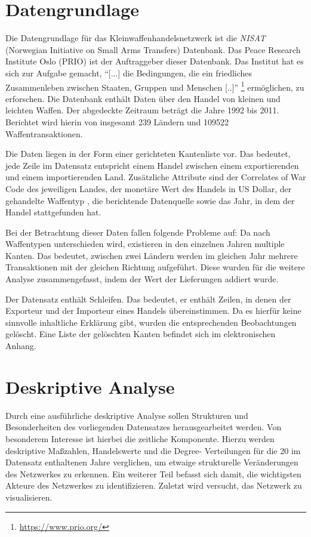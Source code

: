 \documentclass[a4paper,ngerman,oneside,titlepage,bibliography=totoc,11pt]{scrreprt}
\begin{document}
\chapter{Datengrundlage}
Die Datengrundlage für das Kleinwaffenhandelsnetzwerk ist die \emph{NISAT} (Norwegian Initiative on Small Arms Transfers) Datenbank. Das Peace Research Institute Oslo (PRIO) ist der Auftraggeber dieser Datenbank. Das Institut hat es sich zur Aufgabe gemacht, "`[...] die Bedingungen, die ein friedliches Zusammenleben zwischen Staaten, Gruppen und Menschen [..]"' \footnote{\url{https://www.prio.org/}} ermöglichen, zu erforschen. Die Datenbank enthält Daten über den Handel von kleinen und leichten Waffen. Der abgedeckte Zeitraum beträgt die Jahre 1992 bis 2011. Berichtet wird hierin von insgesamt 239 Ländern und 109522 Waffentransaktionen.

Die Daten liegen in der Form einer gerichteten Kantenliste vor. Das bedeutet, jede Zeile im Datensatz entspricht einem Handel zwischen einem exportierenden und einem importierenden Land. Zusätzliche Attribute sind der Correlates of War Code des jeweiligen Landes, der monetäre Wert des Handels in US Dollar, der gehandelte Waffentyp , die berichtende Datenquelle sowie das Jahr, in dem der Handel stattgefunden hat.

Bei der Betrachtung dieser Daten fallen folgende Probleme auf:
Da nach Waffentypen unterschieden wird, existieren in den einzelnen Jahren multiple Kanten. Das bedeutet, zwischen zwei Ländern werden im gleichen Jahr mehrere Transaktionen mit der gleichen Richtung aufgeführt. Diese wurden für die weitere Analyse zusammengefasst, indem der Wert der Lieferungen addiert wurde.

Der Datensatz enthält Schleifen. Das bedeutet, er enthält Zeilen, in denen der Exporteur und der Importeur eines Handels übereinstimmen. Da es hierfür keine sinnvolle inhaltliche Erklärung gibt, wurden die entsprechenden Beobachtungen gelöscht. Eine Liste der gelöschten Kanten befindet sich im elektronischen Anhang.

\chapter{Deskriptive Analyse}
Durch eine ausführliche deskriptive Analyse sollen Strukturen und Besonderheiten des vorliegenden Datensatzes herausgearbeitet werden. Von besonderem Interesse ist hierbei die zeitliche Komponente. Hierzu werden deskriptive Maßzahlen, Handelswerte und die Degree- Verteilungen für die 20 im Datensatz enthaltenen Jahre verglichen, um etwaige strukturelle Veränderungen des Netzwerkes zu erkennen.
Ein weiterer Teil befasst sich damit, die wichtigsten Akteure des Netzwerkes zu identifizieren. Zuletzt wird versucht, das Netzwerk zu visualisieren.
\end{document}
